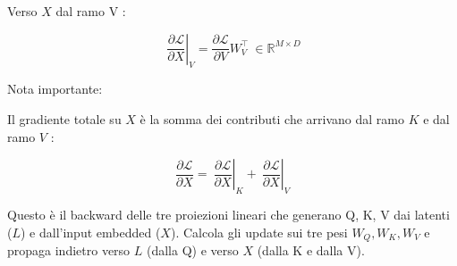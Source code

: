 \documentclass[
  11pt,
]{article}
\begin{document}
Verso \(X\) dal ramo V :

\[\left. \ \frac{\partial\mathcal{L}}{\partial X} \right|_{V} = \frac{\partial\mathcal{L}}{\partial V}W_{V}^{\top}\  \in \mathbb{R}^{M \times D}\]

Nota importante:

Il gradiente totale su \(X\) è la somma dei contributi che arrivano dal
ramo \(K\) e dal ramo \(V\) :

\[\frac{\partial\mathcal{L}}{\partial X} = \left. \ \frac{\partial\mathcal{L}}{\partial X} \right|_{K} + \left. \ \frac{\partial\mathcal{L}}{\partial X} \right|_{V}\]

\begin{notabox}[title={\textbf{Checkpoint gradienti --- fine proiezioni lineari Q/K/V backward}}]
Questo è il backward delle tre proiezioni lineari che generano Q, K, V dai latenti ($L$) e dall'input embedded ($X$). Calcola gli update sui tre pesi $W_Q, W_K, W_V$ e propaga indietro verso $L$ (dalla Q) e verso $X$ (dalla K e dalla V).


\end{notabox}
\end{document}
